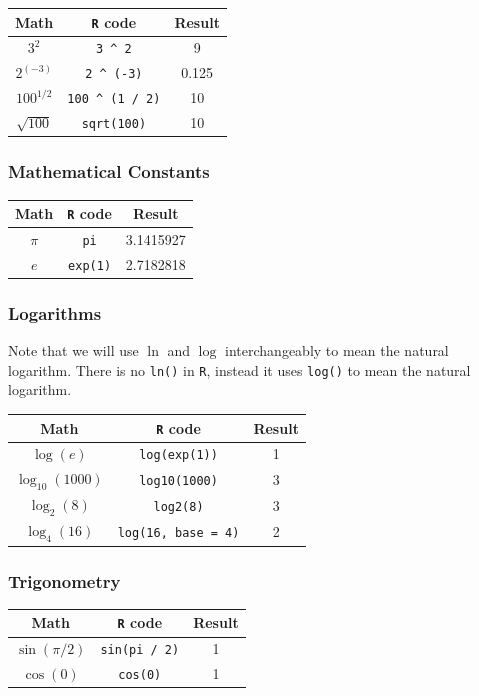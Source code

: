 \documentclass[]{book}
\begin{document}
\begin{longtable}[]{@{}ccc@{}}
\toprule
Math & \texttt{R} code & Result\tabularnewline
\midrule
\endhead
\(3^2\) & \texttt{3\ \^{}\ 2} & 9\tabularnewline
\(2^{(-3)}\) & \texttt{2\ \^{}\ (-3)} & 0.125\tabularnewline
\(100^{1/2}\) & \texttt{100\ \^{}\ (1\ /\ 2)} & 10\tabularnewline
\(\sqrt{100}\) & \texttt{sqrt(100)} & 10\tabularnewline
\bottomrule
\end{longtable}

\subsubsection*{Mathematical Constants}\label{mathematical-constants}

\begin{longtable}[]{@{}ccc@{}}
\toprule
Math & \texttt{R} code & Result\tabularnewline
\midrule
\endhead
\(\pi\) & \texttt{pi} & 3.1415927\tabularnewline
\(e\) & \texttt{exp(1)} & 2.7182818\tabularnewline
\bottomrule
\end{longtable}

\subsubsection*{Logarithms}\label{logarithms}

Note that we will use \(\ln\) and \(\log\) interchangeably to mean the
natural logarithm. There is no \texttt{ln()} in \texttt{R}, instead it
uses \texttt{log()} to mean the natural logarithm.

\begin{longtable}[]{@{}ccc@{}}
\toprule
Math & \texttt{R} code & Result\tabularnewline
\midrule
\endhead
\(\log(e)\) & \texttt{log(exp(1))} & 1\tabularnewline
\(\log_{10}(1000)\) & \texttt{log10(1000)} & 3\tabularnewline
\(\log_{2}(8)\) & \texttt{log2(8)} & 3\tabularnewline
\(\log_{4}(16)\) & \texttt{log(16,\ base\ =\ 4)} & 2\tabularnewline
\bottomrule
\end{longtable}

\subsubsection*{Trigonometry}\label{trigonometry}

\begin{longtable}[]{@{}ccc@{}}
\toprule
Math & \texttt{R} code & Result\tabularnewline
\midrule
\endhead
\(\sin(\pi / 2)\) & \texttt{sin(pi\ /\ 2)} & 1\tabularnewline
\(\cos(0)\) & \texttt{cos(0)} & 1\tabularnewline
\bottomrule
\end{longtable}
\end{document}
